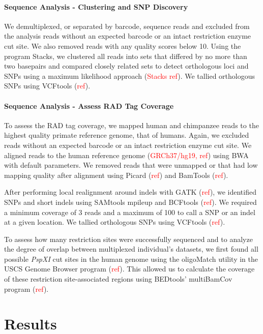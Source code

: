 \documentclass[12pt]{article}
\begin{document}
\paragraph{Sequence Analysis - Clustering and SNP Discovery}

We demultiplexed, or separated by barcode, sequence reads and excluded from the analysis reads without an expected barcode or an intact restriction enzyme cut site. We also removed reads with any quality scores below 10. Using the program Stacks, we clustered all reads into sets that differed by no more than two basepairs and compared closely related sets to detect orthologous loci and SNPs using a maximum likelihood approach (\textcolor{red}{Stacks ref}). We tallied orthologous SNPs using VCFtools (\textcolor{red}{ref}).

\paragraph{Sequence Analysis - Assess RAD Tag Coverage}

To assess the RAD tag coverage, we mapped human and chimpanzee reads to the highest quality primate reference genome, that of humans. Again, we excluded reads without an expected barcode or an intact restriction enzyme cut site. We aligned reads to the human reference genome (\textcolor{red}{GRCh37/hg19, ref}) using BWA with default parameters. We removed reads that were unmapped or that had low mapping quality after alignment using Picard (\textcolor{red}{ref}) and BamTools (\textcolor{red}{ref}). 

After performing local realignment around indels with GATK (\textcolor{red}{ref}), we identified SNPs and short indels using SAMtools mpileup and BCFtools (\textcolor{red}{ref}). We required a minimum coverage of 3 reads and a maximum of 100 to call a SNP or an indel at a given location. We tallied orthologous SNPs using VCFtools (\textcolor{red}{ref}).
	
To assess how many restriction sites were successfully sequenced and to analyze the degree of overlap between multiplexed individual's datasets, we first found all possible \emph{PspXI} cut sites in the human genome using the oligoMatch utility in the USCS Genome Browser program (\textcolor{red}{ref}). This allowed us to calculate the coverage of these restriction site-associated regions using BEDtools' multiBamCov program (\textcolor{red}{ref}).

\section{Results}
\end{document}
